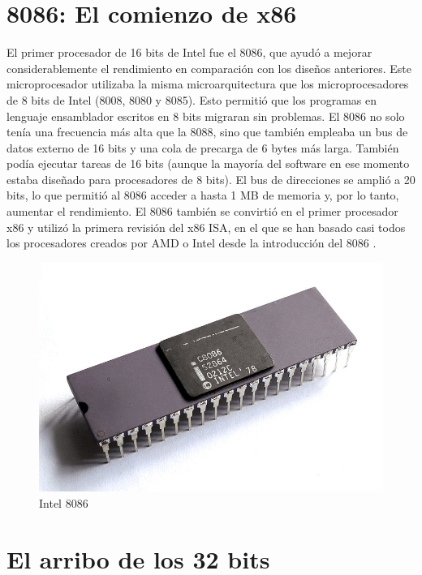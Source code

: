 \section{8086: El comienzo de x86}
El primer procesador de 16 bits de Intel fue el 8086, que ayudó a mejorar considerablemente el rendimiento en comparación con los diseños anteriores.
Este microprocesador utilizaba la misma microarquitectura que los microprocesadores de 8 bits de Intel (8008, 8080 y 8085). Esto permitió que los programas 
en lenguaje ensamblador escritos en 8 bits migraran sin problemas. El 8086 no solo tenía una frecuencia más alta que la 8088, sino que también empleaba un 
bus de datos externo de 16 bits y una cola de precarga de 6 bytes más larga. También podía ejecutar tareas de 16 bits (aunque la mayoría del software en ese 
momento estaba diseñado para procesadores de 8 bits). El bus de direcciones se amplió a 20 bits, lo que permitió al 8086 acceder a hasta 1 MB de memoria y, 
por lo tanto, aumentar el rendimiento. El 8086 también se convirtió en el primer procesador x86 y utilizó la primera revisión del x86 ISA, en el que se han 
basado casi todos los procesadores creados por AMD o Intel desde la introducción del 8086 .
\begin{figure}[htb]
	\centering
	\includegraphics[scale = 0.2]{Graphics/Intel_C8086.jpg}
	\caption{Intel 8086}
	\label{fig:16}
\end{figure}

\section{El arribo de los 32 bits}

